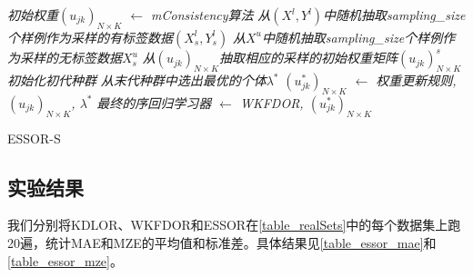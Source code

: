 \IncMargin{1em}
\begin{algorithm}[!h]
\emph{初始权重$(u_{jk})_{N \times K}$ $\leftarrow$ \textit{mConsistency}算法}\;
\emph{从$(X^{l},Y^{l})$中随机抽取sampling\_size个样例作为采样的有标签数据$(X_{s}^{l},Y_{s}^{l})$}\;
\emph{从$X^{u}$中随机抽取sampling\_size个样例作为采样的无标签数据$X_{s}^{u}$}\;
\emph{从$(u_{jk})_{N \times K}$抽取相应的采样的初始权重矩阵$(u_{jk})_{N \times K}^{s}$}\;
\emph{初始化初代种群}\;
\emph{从末代种群中选出最优的个体$\lambda^{*}$}\;
\emph{$(u_{jk}^{*})_{N \times K}$ $\leftarrow$ 权重更新规则, $(u_{jk})_{N \times K}$, $\lambda^{*}$}\;
\emph{最终的序回归学习器 $\leftarrow$ WKFDOR, $(u_{jk}^{*})_{N \times K}$}\;
\caption{ESSOR-S}\label{alg_ESSOR_sampling}
\end{algorithm}\DecMargin{1em}


\subsection{实验结果}

我们分别将KDLOR、WKFDOR和ESSOR在\autoref{table_realSets}中的每个数据集上跑20遍，统计MAE和MZE的平均值和标准差。具体结果见\autoref{table_essor_mae}和\autoref{table_essor_mze}。

